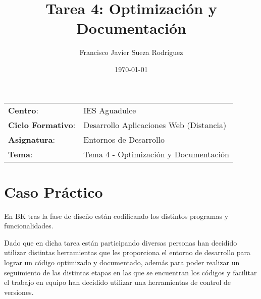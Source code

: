 


\title{
    \vspace{10ex}
    \normalfont \normalsize
    \huge \textbf{Tarea 4: Optimización y Documentación}
}
\author{Francisco Javier Sueza Rodríguez}
\date{\normalsize\today}



\maketitle

\thispagestyle{empty}

\vspace{75ex}

\begin{center}
    \begin{tabular}{l l}
        \textbf{Centro}: & IES Aguadulce \\
        \textbf{Ciclo Formativo}: & Desarrollo Aplicaciones Web (Distancia)\\
        \textbf{Asignatura}: & Entornos de Desarrollo\\
       \textbf{Tema}: & Tema 4 - Optimización y Documentación\\
    \end{tabular}
\end{center}

\newpage

\tableofcontents

\newpage

\listoffigures

\newpage

\section{Caso Práctico}
En  BK tras la fase de diseño están codificando los distintos programas y funcionalidades.

Dado que en dicha tarea están participando diversas personas han decidido utilizar distintas herramientas que les proporciona el entorno de desarrollo para lograr un código optimizado y documentado, además para poder realizar un seguimiento de las distintas etapas en las que se encuentran los códigos y facilitar el trabajo en equipo han decidido utilizar una herramientas de control de versiones.

